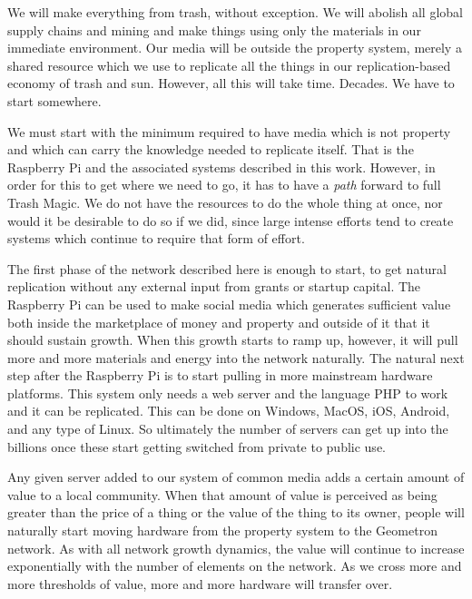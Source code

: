 

We will make everything from trash, without exception. We will abolish
all global supply chains and mining and make things using only the
materials in our immediate environment. Our media will be outside the
property system, merely a shared resource which we use to replicate all
the things in our replication-based economy of trash and sun. However,
all this will take time. Decades. We have to start somewhere.

We must start with the minimum required to have media which is not
property and which can carry the knowledge needed to replicate itself.
That is the Raspberry Pi and the associated systems described in this
work. However, in order for this to get where we need to go, it has to
have a \emph{path} forward to full Trash Magic. We do not have the
resources to do the whole thing at once, nor would it be desirable to do
so if we did, since large intense efforts tend to create systems which
continue to require that form of effort.

The first phase of the network described here is enough to start, to get
natural replication without any external input from grants or startup
capital. The Raspberry Pi can be used to make social media which
generates sufficient value both inside the marketplace of money and
property and outside of it that it should sustain growth. When this
growth starts to ramp up, however, it will pull more and more materials
and energy into the network naturally. The natural next step after the
Raspberry Pi is to start pulling in more mainstream hardware platforms.
This system only needs a web server and the language PHP to work and it
can be replicated. This can be done on Windows, MacOS, iOS, Android, and
any type of Linux. So ultimately the number of servers can get up into
the billions once these start getting switched from private to public
use.

Any given server added to our system of common media adds a certain
amount of value to a local community. When that amount of value is
perceived as being greater than the price of a thing or the value of the
thing to its owner, people will naturally start moving hardware from the
property system to the Geometron network. As with all network growth
dynamics, the value will continue to increase exponentially with the
number of elements on the network. As we cross more and more thresholds
of value, more and more hardware will transfer over.

